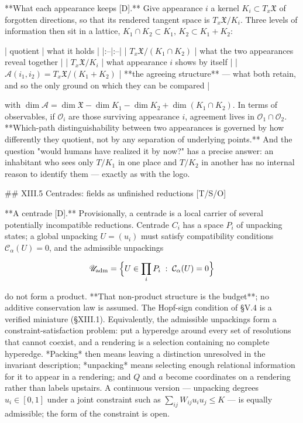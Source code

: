 **What each appearance keeps [D].** Give appearance $i$ a kernel $K_i\subset T_x\mathfrak X$ of forgotten directions, so that its rendered tangent space is $T_x\mathfrak X/K_i$. Three levels of information then sit in a lattice, $K_1\cap K_2\subset K_1,\,K_2\subset K_1+K_2$:

| quotient | what it holds |
|:--|:--|
| $T_x\mathfrak X/(K_1\cap K_2)$ | what the two appearances reveal together |
| $T_x\mathfrak X/K_i$ | what appearance $i$ shows by itself |
| $\mathcal A(i_1,i_2) = T_x\mathfrak X/(K_1+K_2)$ | **the agreeing structure** — what both retain, and so the only ground on which they can be compared |

with $\dim\mathcal A = \dim\mathfrak X-\dim K_1-\dim K_2+\dim(K_1\cap K_2)$. In terms of observables, if $\mathcal O_i$ are those surviving appearance $i$, agreement lives in $\mathcal O_1\cap\mathcal O_2$. **Which-path distinguishability between two appearances is governed by how differently they quotient, not by any separation of underlying points.** And the question "would humans have realized it by now?" has a precise answer: an inhabitant who sees only $T/K_1$ in one place and $T/K_2$ in another has no internal reason to identify them — exactly as with the logo.

## XIII.5 Centrades: fields as unfinished reductions [T/S/O]

**A centrade [D].** Provisionally, a centrade is a local carrier of several potentially incompatible reductions. Centrade $C_i$ has a space $P_i$ of unpacking states; a global unpacking $U = (u_i)$ must satisfy compatibility conditions $\mathcal C_\alpha(U) = 0$, and the admissible unpackings

$$\mathscr U_{\rm adm} = \Big\{U\in\prod_iP_i\;:\;\mathcal C_\alpha(U) = 0\Big\}$$

do not form a product. **That non-product structure is the budget**; no additive conservation law is assumed. The Hopf-sign condition of §V.4 is a verified miniature (§XIII.1). Equivalently, the admissible unpackings form a constraint-satisfaction problem: put a hyperedge around every set of resolutions that cannot coexist, and a rendering is a selection containing no complete hyperedge. *Packing* then means leaving a distinction unresolved in the invariant description; *unpacking* means selecting enough relational information for it to appear in a rendering; and $Q$ and $a$ become coordinates on a rendering rather than labels upstairs. A continuous version — unpacking degrees $u_i\in[0,1]$ under a joint constraint such as $\sum_{ij}W_{ij}u_iu_j\le K$ — is equally admissible; the form of the constraint is open.

